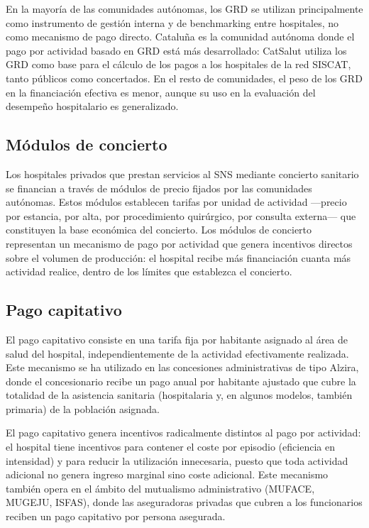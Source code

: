 En la mayoría de las comunidades autónomas, los GRD se utilizan principalmente como instrumento de gestión interna y de benchmarking entre hospitales, no como mecanismo de pago directo. Cataluña es la comunidad autónoma donde el pago por actividad basado en GRD está más desarrollado: CatSalut utiliza los GRD como base para el cálculo de los pagos a los hospitales de la red SISCAT, tanto públicos como concertados. En el resto de comunidades, el peso de los GRD en la financiación efectiva es menor, aunque su uso en la evaluación del desempeño hospitalario es generalizado.

\subsection{Módulos de concierto}

Los hospitales privados que prestan servicios al SNS mediante concierto sanitario se financian a través de módulos de precio fijados por las comunidades autónomas. Estos módulos establecen tarifas por unidad de actividad ---precio por estancia, por alta, por procedimiento quirúrgico, por consulta externa--- que constituyen la base económica del concierto. Los módulos de concierto representan un mecanismo de pago por actividad que genera incentivos directos sobre el volumen de producción: el hospital recibe más financiación cuanta más actividad realice, dentro de los límites que establezca el concierto.

\subsection{Pago capitativo}

El pago capitativo consiste en una tarifa fija por habitante asignado al área de salud del hospital, independientemente de la actividad efectivamente realizada. Este mecanismo se ha utilizado en las concesiones administrativas de tipo Alzira, donde el concesionario recibe un pago anual por habitante ajustado que cubre la totalidad de la asistencia sanitaria (hospitalaria y, en algunos modelos, también primaria) de la población asignada.

El pago capitativo genera incentivos radicalmente distintos al pago por actividad: el hospital tiene incentivos para contener el coste por episodio (eficiencia en intensidad) y para reducir la utilización innecesaria, puesto que toda actividad adicional no genera ingreso marginal sino coste adicional. Este mecanismo también opera en el ámbito del mutualismo administrativo (MUFACE, MUGEJU, ISFAS), donde las aseguradoras privadas que cubren a los funcionarios reciben un pago capitativo por persona asegurada.

